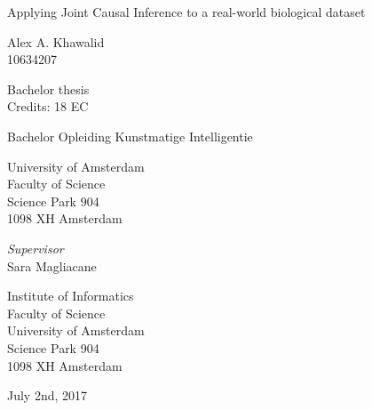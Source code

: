 \documentclass[a4paper,pdf]{article}
\begin{document}
\begin{center}

\vspace{2.5cm}

\begin{Huge}
Applying Joint Causal Inference to a real-world biological dataset
\end{Huge}

\vspace{1.5cm}

Alex A. Khawalid\\
10634207

\vspace{1.5cm}

Bachelor thesis\\
Credits: 18 EC
\vspace{0.5cm}

Bachelor Opleiding Kunstmatige Intelligentie

\vspace{0.25cm}

University of Amsterdam\\
Faculty of Science\\
Science Park 904\\
1098 XH Amsterdam

\vspace{4cm}

\emph{Supervisor}\\
Sara Magliacane

\vspace{0.25cm}

Institute of Informatics\\
Faculty of Science\\
University of Amsterdam\\
Science Park 904\\
1098 XH  Amsterdam

\vspace{1.5cm}

July 2nd, 2017

\end{center}
\end{document}
